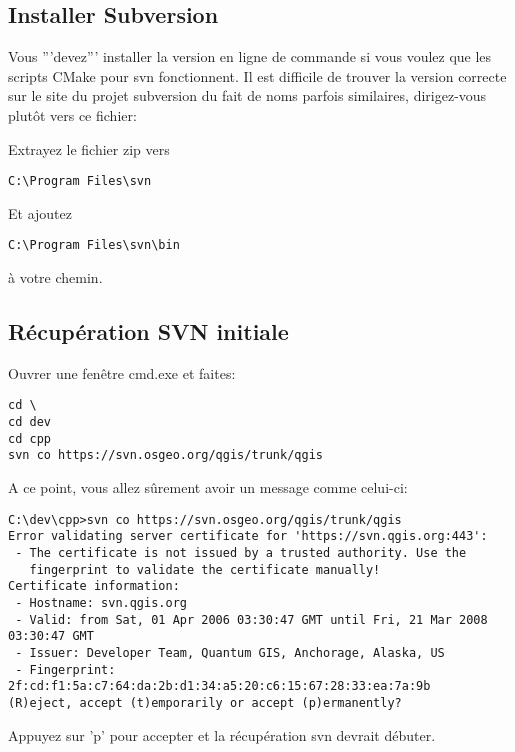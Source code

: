 \subsection{Installer Subversion}
Vous '''devez''' installer la version en ligne de commande si vous voulez que les scripts CMake pour svn fonctionnent. Il est difficile de trouver la version correcte sur le site du projet subversion du fait de noms parfois similaires, dirigez-vous plutôt vers ce fichier:


Extrayez le fichier zip vers
\begin{verbatim}
C:\Program Files\svn
\end{verbatim}

Et ajoutez

\begin{verbatim}
C:\Program Files\svn\bin
\end{verbatim}

à votre chemin.

\subsection{Récupération SVN initiale}
Ouvrer une fenêtre cmd.exe et faites:

\begin{verbatim}
cd \
cd dev
cd cpp
svn co https://svn.osgeo.org/qgis/trunk/qgis 
\end{verbatim}

A ce point, vous allez sûrement avoir un message comme celui-ci:

\begin{verbatim}
C:\dev\cpp>svn co https://svn.osgeo.org/qgis/trunk/qgis
Error validating server certificate for 'https://svn.qgis.org:443':
 - The certificate is not issued by a trusted authority. Use the
   fingerprint to validate the certificate manually!
Certificate information:
 - Hostname: svn.qgis.org
 - Valid: from Sat, 01 Apr 2006 03:30:47 GMT until Fri, 21 Mar 2008 03:30:47 GMT
 - Issuer: Developer Team, Quantum GIS, Anchorage, Alaska, US
 - Fingerprint: 2f:cd:f1:5a:c7:64:da:2b:d1:34:a5:20:c6:15:67:28:33:ea:7a:9b
(R)eject, accept (t)emporarily or accept (p)ermanently?
\end{verbatim}

Appuyez sur 'p' pour accepter et la récupération svn devrait débuter.

